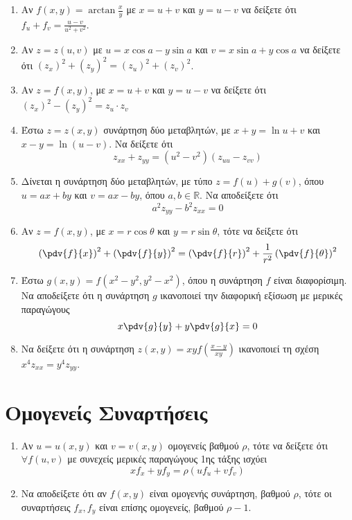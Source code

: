 \documentclass[a4paper,table]{report}
\begin{document}
\begin{enumerate}
  \item Αν $ f(x,y) = \arctan{\frac{x}{y}} $ με $ x=u+v $ και $ y = u-v $ 
    να δείξετε ότι $ f_{u} + f_{v} = \frac{u-v}{u^{2}+v^{2}} $.

  \item  Αν $ z=z(u,v) $ με $ u=x \cos{a} - y \sin{a} $ και $ v= x \sin{a} + y \cos{a} $
    να δείξετε ότι $ (z_{x})^{2} + (z_{y})^{2} = (z_{u})^{2} + (z_{v})^{2} $.

  \item Αν $ z=f(x,y) $, με $ x=u+v $ και $ y = u-v $ να δείξετε ότι 
    $ (z_{x})^{2} - (z_{y})^{2} = z_{u}\cdot z_{v} $ 

  \item Έστω $ z=z(x,y) $ συνάρτηση δύο μεταβλητών, με $ x+y= \ln{u+v} $ και 
    $ x-y = \ln{(u-v)} $. Να δείξετε ότι 
    \[
      z_{xx}+z_{yy} = (u^{2}-v^{2})(z_{uu}-z_{vv}) 
    \]
  \item Δίνεται η συνάρτηση δύο μεταβλητών, με τύπο
    $ z = f(u) + g(v) $, όπου $ u = ax + by $ και $ v = ax - by $, όπου 
    $ a,b \in \mathbb{R} $. Να αποδείξετε ότι 
    \[
      a^{2} z_{yy} - b^{2}z_{xx} = 0 
    \] 
  \item Αν $ z = f(x,y) $, με $ x=r \cos{\theta} $ και $ y = r \sin{\theta} $, 
    τότε να δείξετε ότι
    \[
      \left(\pdv{f}{x}\right)^{2} + \left(\pdv{f}{y}\right)^{2} = 
      \left(\pdv{f}{r}\right)^{2} + \frac{1}{ r^{2}} 
      \left(\pdv{f}{\theta}\right)^{2} 
    \] 
  \item Έστω $ g(x,y) = f(x^{2} - y^{2}, y^{2} - x^{2}) $, όπου η συνάρτηση 
    $f$ είναι διαφορίσιμη. Να αποδείξετε ότι η συνάρτηση $g$ ικανοποιεί 
    την διαφορική εξίσωση με μερικές παραγώγους
    \[
      x\pdv{g}{y} + y\pdv{g}{x} = 0
    \] 
  \item Να δείξετε ότι η συνάρτηση $ z(x,y) = xyf\left(\frac{ x-y }{ xy }\right) $
    ικανοποιεί τη σχέση $ x^{4} z_{xx} = y^{4} z_{yy} $.
\end{enumerate}


\section*{Ομογενείς Συναρτήσεις}

\begin{enumerate}
  \item Αν $ u = u(x,y) $ και $ v=v(x,y) $ ομογενείς βαθμού $ \rho $, 
    τότε να δείξετε ότι $ \forall f(u,v) $ με συνεχείς μερικές παραγώγους 1ης τάξης
    ισχύει 
    \[
      xf_{x}+yf_{y}= \rho (u f_{u}+vf_{v}) 
    \] 
  \item Να αποδείξετε ότι αν $f(x,y)$ είναι ομογενής συνάρτηση, βαθμού $ \rho $, τότε 
    οι συναρτήσεις $ f_{x}, f_{y} $ είναι επίσης ομογενείς, βαθμού $ \rho -1 $.
\end{enumerate}
\end{document}
